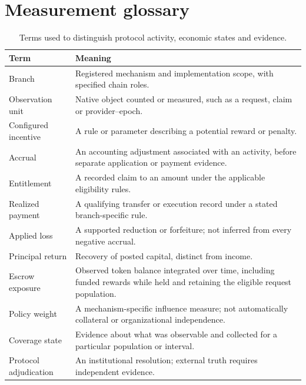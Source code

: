 \section{Measurement glossary}
\label{app:glossary}

\begin{table}[!htbp]
\centering\tabstyle
\caption{Terms used to distinguish protocol activity, economic states and evidence.}
\begin{tabularx}{\linewidth}{@{}L{.25\linewidth}Y@{}}
\toprule Term & Meaning \\ \midrule
Branch & Registered mechanism and implementation scope, with specified chain roles. \\
Observation unit & Native object counted or measured, such as a request, claim or provider--epoch. \\
Configured incentive & A rule or parameter describing a potential reward or penalty. \\
Accrual & An accounting adjustment associated with an activity, before separate application or payment evidence. \\
Entitlement & A recorded claim to an amount under the applicable eligibility rules. \\
Realized payment & A qualifying transfer or execution record under a stated branch-specific rule. \\
Applied loss & A supported reduction or forfeiture; not inferred from every negative accrual. \\
Principal return & Recovery of posted capital, distinct from income. \\
Escrow exposure & Observed token balance integrated over time, including funded rewards while held and retaining the eligible request population. \\
Policy weight & A mechanism-specific influence measure; not automatically collateral or organizational independence. \\
Coverage state & Evidence about what was observable and collected for a particular population or interval. \\
Protocol adjudication & An institutional resolution; external truth requires independent evidence. \\
\bottomrule
\end{tabularx}
\end{table}
